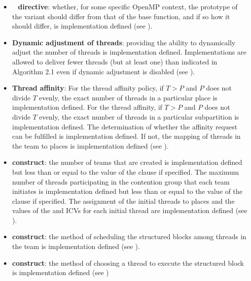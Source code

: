 \begin{itemize}
\item {}~ \textbf{directive}: whether, for some specific
  OpenMP context, the prototype of the variant should differ from that of
  the base function, and if so how it should differ, is implementation defined
  (see ).

\item \textbf{Dynamic adjustment of threads}: providing the ability to dynamically adjust the
number of threads is implementation defined. Implementations are allowed to deliver
fewer threads (but at least one) than indicated in Algorithm 2.1 even if dynamic
adjustment is disabled (see ).

\item \textbf{Thread affinity}: For the  thread affinity
  policy, if $T > P$ and $P$ does not divide $T$ evenly, the exact
  number of threads in a particular place is implementation defined.
  For the  thread affinity, if $T > P$ and $P$ does not
  divide $T$ evenly, the exact number of threads in a particular
  subpartition is implementation defined.  The determination of
  whether the affinity request can be fulfilled is implementation
  defined.  If not, the mapping of threads in the team 
  to places is implementation defined (see
  ).

\item {} \textbf{construct}: the number of teams that are created is implementation defined but
less than or equal to the value of the  clause if specified. The maximum
number of threads participating in the contention group that each team initiates is
implementation defined but less than or equal to the value of the 
clause if specified.  The assignment of the initial threads to places and
the values of the  and
 ICVs for each initial thread are
implementation defined (see ).

\item {} \textbf{construct}: the method of scheduling the structured blocks among threads
in the team is implementation defined (see ).

\item {} \textbf{construct}: the method of choosing a thread to execute the structured block
is implementation defined (see )


\end{itemize}
